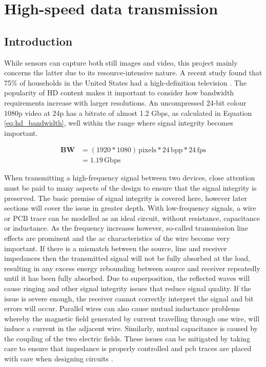 \chapter{High-speed data transmission}

\section{Introduction}

While sensors can capture both still images and video, this project mainly concerns the latter due to its resource-intensive nature. A recent study found that 75\% of households in the United States had a high-definition television \cite{14_leichtman_research_group_2013}. The popularity of HD content makes it important to consider how bandwidth requirements increase with larger resolutions. An uncompressed 24-bit colour 1080p video at 24p has a bitrate of almost 1.2 Gbps, as calculated in Equation \ref{eq:hd_bandwidth}, well within the range where signal integrity becomes important.

\begin{equation}
  \begin{split}
    \mathbf{BW} &= (1920*1080) \, \mathrm{pixels} * 24  \, \mathrm{bpp} * 24 \, \mathrm{fps} \\
                &= 1.19  \, \mathrm{Gbps}
  \end{split}  
  \label{eq:hd_bandwidth}
\end{equation}

When transmitting a high-frequency signal between two devices, close attention must be paid to many aspects of the design to ensure that the signal integrity is preserved. The basic premise of signal integrity is covered here, however later sections will cover the issue in greater depth. With low-frequency signals, a wire or PCB trace can be modelled as an ideal circuit, without resistance, capacitance or inductance. As the frequency increases however, so-called transmission line effects are prominent and the \gls{ac} characteristics of the wire become very important. If there is a mismatch between the source, line and receiver impedances then the transmitted signal will not be fully absorbed at the load, resulting in any excess energy rebounding between source and receiver repeatedly until it has been fully absorbed. Due to superposition, the reflected waves will cause ringing and other signal integrity issues that reduce signal quality. If the issue is severe enough, the receiver cannot correctly interpret the signal and bit errors will occur. Parallel wires can also cause mutual inductance problems whereby the magnetic field generated by current travelling through one wire, will induce a current in the adjacent wire. Similarly, mutual capacitance is caused by the coupling of the two electric fields. These issues can be mitigated by taking care to ensure that impedance is properly controlled and \gls{pcb} traces are placed with care when designing circuits \cite{15_basic_principles_of_signal_integrity_2007}.


